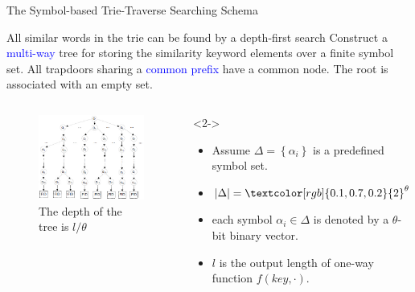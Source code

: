 \documentclass[handout]{beamer}
\begin{document}
\begin{frame}{The Symbol-based Trie-Traverse Searching Schema}
	\begin{block}{All similar words in the trie can be found by a depth-first search}
		Construct a \textcolor{blue}{multi-way} tree for storing the similarity keyword elements over a finite symbol set. All trapdoors sharing a \textcolor{blue}{common prefix} have a common node. The root is associated with an empty set. 
	\end{block}
	\begin{columns}
    \begin{figure}
      \includegraphics[width=\textwidth]{fig2.jpg}
      \caption{The depth of the tree is $l/\theta$}
    \end{figure}
    \begin{exampleblock}<2->{}
    	\begin{itemize}
    		\item Assume $\Delta  = \left\{ {{\alpha _i}} \right\}$ is a predefined symbol set.
    		\item $\left| \Delta  \right| = {\textcolor[rgb]{0.1,0.7,0.2}{2}^\theta }$
    		\item each symbol ${\alpha _i} \in \Delta $ is denoted by a $\theta$-bit \textcolor[rgb]{0.1,0.7,0.2}{binary} vector.
    		\item $l$ is the output length of one-way function $f(key, \cdot )$.
    	\end{itemize}
    	
    \end{exampleblock}
    \end{columns}
\end{frame}
\end{document}
